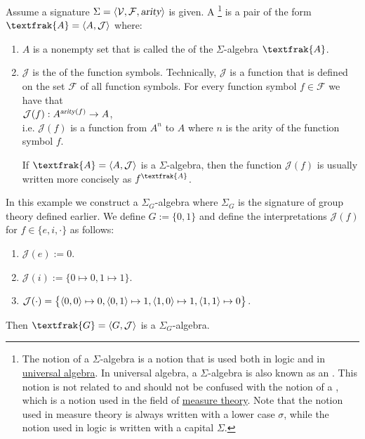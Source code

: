 \begin{Definition}
  Assume a signature $\Sigma = \langle \mathcal{V}, \mathcal{F}, \textsl{arity} \rangle$ is given.  A
  \footnote{
    The notion of a $\Sigma$-algebra is a notion that is used both in logic and in
    \href{https://en.wikipedia.org/wiki/Universal_algebra}{universal algebra}.  In universal algebra, a
    $\Sigma$-algebra is also known as an .  This notion is not related to and should
    not be confused with the notion of a , which is a notion used in the field of
    \href{https://en.wikipedia.org/wiki/Measure_(mathematics)}{measure theory}.  Note that the notion used in
    measure theory is always written with a lower case $\sigma$, while the notion used in logic is written with
    a capital $\Sigma$. 
  } is a pair of the form $\textfrak{A} = \pair(A, \mathcal{J})$ where:
  \begin{enumerate}
  \item $A$ is a nonempty set that is called the  of the $\Sigma$-algebra $\textfrak{A}$.
  \item $\mathcal{J}$ is the  of the function symbols.  Technically, $\mathcal{J}$ is a
        function that is defined on the set $\mathcal{F}$ of all function symbols.  For every function symbol
        $f \in \mathcal{F}$ we have that 
        \\[0.2cm]
        \hspace*{1.3cm}
        $\mathcal{J}(f): A^{\textsl{arity}(f)} \rightarrow A$, 
        \\[0.2cm]
        i.e. $\mathcal{J}(f)$ is a function from $A^n$ to $A$ where $n$ is the arity of the function symbol
        $f$.

        If $\textfrak{A} = \pair(A, \mathcal{J})$ is a $\Sigma$-algebra, then the function $\mathcal{J}(f)$ is 
        usually written more concisely as $f^\textfrak{A}$. \eoxs
  \end{enumerate}
\end{Definition}

\example
In this example we construct a $\Sigma_G$-algebra where $\Sigma_G$ is the signature of group theory defined
earlier.  We define $G := \{ 0, 1 \}$ and define the interpretations $\mathcal{J}(f)$ for $f \in \{e, i, \cdot
\}$ as follows:
\begin{enumerate}
\item $\mathcal{J}(e) := 0$.
\item $\mathcal{J}(i) := \bigl\{ 0 \mapsto 0, 1 \mapsto 1 \bigr\}$.
\item $\mathcal{J}(\cdot) = \bigl\{ \pair(0,0) \mapsto 0,
                                    \pair(0,1) \mapsto 1,
                                    \pair(1,0) \mapsto 1,
                                    \pair(1,1) \mapsto 0
                            \bigr\}$.
\end{enumerate}
Then $\textfrak{G} = \pair(G, \mathcal{J})$ is a $\Sigma_G$-algebra.  \eoxs

